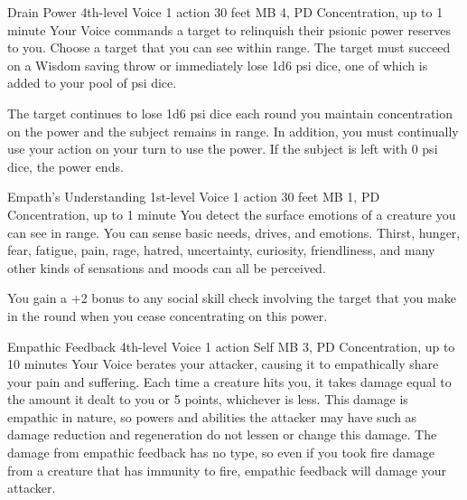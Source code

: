 \DndPowerHeader%
  {Drain Power}
  {4th-level Voice}
  {1 action}
  {30 feet}
  {MB 4, PD \lvlfour}
  {Concentration, up to 1 minute}
Your Voice commands a target to relinquish their psionic power
reserves to you.
Choose a target that you can see within range.
The target must succeed on a Wisdom saving throw
or immediately lose 1d6 psi dice, one of which is added
to your pool of psi dice.

The target continues to lose 1d6 psi dice each round you
maintain concentration on the power and the subject remains
in range.
In addition, you must continually use your action on your turn
to use the power.
If the subject is left with 0 psi dice, the power ends.

\DndPowerHeader%
  {Empath's Understanding}
  {1st-level Voice}
  {1 action}
  {30 feet}
  {MB 1, PD \lvlone}
  {Concentration, up to 1 minute}
You detect the surface emotions of a creature you can see in range.
You can sense basic needs, drives, and emotions.
Thirst, hunger, fear, fatigue, pain, rage, hatred, uncertainty,
curiosity, friendliness, and many other kinds of sensations and moods
can all be perceived.

You gain a +2 bonus to any social skill check involving the target
that you make in the round when you cease concentrating on this power.

\DndPowerHeader%
  {Empathic Feedback}
  {4th-level Voice}
  {1 action}
  {Self}
  {MB 3, PD \lvlfour}
  {Concentration, up to 10 minutes}
Your Voice berates your attacker,
causing it to empathically share your pain and suffering.
Each time a creature hits you,
it takes damage equal to the amount it dealt to you or 5 points,
whichever is less.
This damage is empathic in nature,
so powers and abilities the attacker may have such as damage reduction
and regeneration do not lessen or change this damage.
The damage from empathic feedback has no type,
so even if you took fire damage from a creature
that has immunity to fire,
empathic feedback will damage your attacker.

